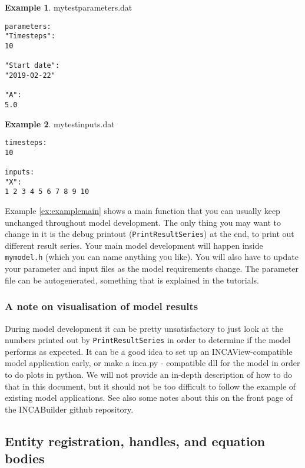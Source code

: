 \documentclass[11pt]{article}
\theoremstyle{definition}
\newtheorem{myexample}{Example}
\newenvironment{example}%
  {\begin{lrbox}{\examplebox}%
   \begin{minipage}{\dimexpr\linewidth-2\fboxsep}
   \begin{myexample}}%
  {\end{myexample}%
   \end{minipage}%
   \end{lrbox}%
   \begin{trivlist}
     \item[]\colorbox{silver}{\usebox\examplebox}
   \end{trivlist}}
\begin{document}
\begin{example}
mytestparameters.dat
\begin{lstlisting}[style=textstyle]
parameters:
"Timesteps":
10

"Start date":
"2019-02-22"

"A":
5.0
\end{lstlisting}
\end{example}

\begin{example}
mytestinputs.dat
\begin{lstlisting}[style=textstyle]
timesteps:
10

inputs:
"X":
1 2 3 4 5 6 7 8 9 10
\end{lstlisting}
\end{example}

Example \ref{ex:examplemain} shows a main function that you can usually keep unchanged throughout model development. The only thing you may want to change in it is the debug printout ({\tt PrintResultSeries}) at the end, to print out different result series. Your main model development will happen inside {\tt mymodel.h} (which you can name anything you like). You will also have to update your parameter and input files as the model requirements change. The parameter file can be autogenerated, something that is explained in the tutorials.

\subsubsection{A note on visualisation of model results}

During model development it can be pretty unsatisfactory to just look at the numbers printed out by {\tt PrintResultSeries} in order to determine if the model performs as expected. It can be a good idea to set up an INCAView-compatible model application early, or make a inca.py - compatible dll for the model in order to do plots in python. We will not provide an in-depth description of how to do that in this document, but it should not be too difficult to follow the example of existing model applications. See also some notes about this on the front page of the INCABuilder github repository.

\subsection{Entity registration, handles, and equation bodies}\label{sec:registrationandhandles}
\end{document}
